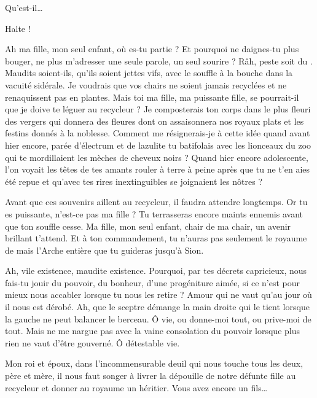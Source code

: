 \begin{drama}

  \elenaspeaks {} Qu’est-il…

  \kingsgardsspeaks {} Halte !

  \roispeaks {}  Ah ma fille, mon seul enfant, où es-tu partie ? Et pourquoi ne daignes-tu plus bouger, ne plus m’adresser une seule parole, un seul sourire ? Râh, peste soit du \campoppose{}. Maudits soient-ils, qu’ils soient jettes vifs, avec le souffle à la bouche dans la vacuité sidérale. Je voudrais que vos chairs ne soient jamais recyclées et ne renaquissent  pas en plantes. Mais toi ma fille, ma puissante fille, se pourrait-il que je doive te léguer au recycleur ? Je composterais ton corps dans le plus fleuri des vergers qui donnera des fleures dont on assaisonnera nos royaux plats et les festins donnés à la noblesse. 
  Comment me résignerais-je à cette idée quand avant hier encore, parée d’électrum et de lazulite tu batifolais avec les lionceaux du zoo qui te mordillaient les mèches de cheveux noirs ? Quand hier encore adolescente, l’on voyait les têtes  de tes amants rouler à terre à peine après que tu ne t’en aies été repue et qu’avec tes rires inextinguibles se joignaient les nôtres ?

  Avant que ces souvenirs aillent au recycleur, il faudra attendre longtemps. Or tu es puissante, n’est-ce pas ma fille ? Tu terrasseras encore maints ennemis avant que ton souffle cesse. Ma fille, mon seul enfant, chair de ma chair, un avenir brillant t’attend. Et à ton commandement, tu n’auras pas seulement le royaume de \campprincipal{} mais l’Arche entière que tu guideras jusqu’à Sion.

  Ah, vile existence, maudite existence. Pourquoi, par tes décrets capricieux, nous fais-tu jouir du pouvoir, du bonheur, d’une progéniture aimée, si ce n’est pour mieux nous accabler lorsque tu nous les retire ? Amour qui ne vaut qu’au jour où il nous est dérobé. Ah, que le sceptre démange la main droite qui le tient lorsque la gauche ne peut balancer le berceau. Ô vie, ou donne-moi tout, ou prive-moi de tout. Mais ne me nargue pas  avec la vaine consolation du pouvoir lorsque plus rien ne vaut d’être gouverné. Ô détestable vie.

  \reinespeaks {} Mon roi et époux, dans l’incommensurable deuil qui nous touche tous les deux, père et mère, il nous faut songer à livrer la dépouille de notre défunte fille au recycleur et donner au royaume un héritier. Vous avez encore un fils…


\end{drama}
